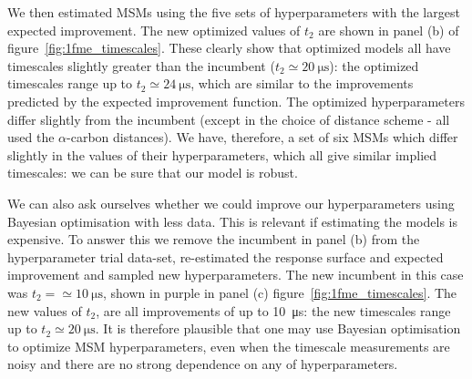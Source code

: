 \documentclass[journal=jacsat,manuscript=article]{achemso}
\begin{document}
We then estimated MSMs using the five sets of hyperparameters with the largest expected improvement. The new optimized values of $t_2$ are shown in panel (b) of figure~\ref{fig:1fme_timescales}.  These clearly show that optimized models all have timescales slightly greater than the incumbent ($t_2 \simeq \SI{20}{\micro\second}$):  the optimized timescales range up to $t_2 \simeq \SI{24}{\micro\second}$, which are similar to the improvements predicted by the expected improvement function. The optimized hyperparameters differ slightly from the incumbent (except in the choice of distance scheme - all used the $\alpha$-carbon distances). We have, therefore, a set of six MSMs which differ slightly in the values of their hyperparameters, which all give similar implied timescales: we can be sure that our model is robust. 


We can also ask ourselves whether we could improve our hyperparameters using Bayesian optimisation with less data. This is relevant if estimating the models is expensive. To answer this we remove the incumbent in panel (b) from the hyperparameter trial data-set, re-estimated the response surface and expected improvement and sampled new hyperparameters. The new incumbent in this case was $t_2 = \simeq \SI{10}{\micro\second}$, shown in purple in panel (c) figure~\ref{fig:1fme_timescales}.  The new values of $t_2$,  are all improvements of up to \SI{10}{\micro\second}: the new timescales range up to $t_2 \simeq \SI{20}{\micro\second}$. It is therefore plausible that one may use Bayesian optimisation to optimize MSM hyperparameters, even when the timescale measurements are noisy and there are no strong dependence on any of hyperparameters.  
\end{document}
